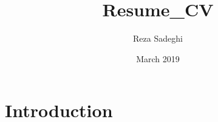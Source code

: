 \documentclass{article}
\title{Resume_CV}
\author{Reza Sadeghi}
\date{March 2019}
\begin{document}
\maketitle

\section{Introduction}
\end{document}
